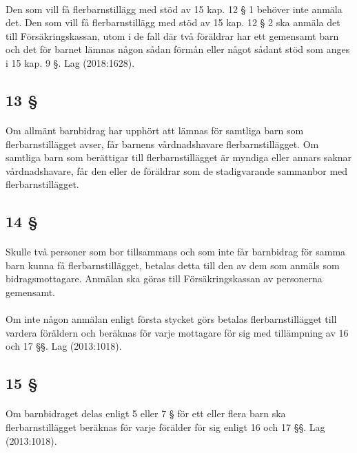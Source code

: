 \documentclass[a4paper,notitlepage,openany,10pt]{book}
\begin{document}
\paragraph*{}
Den som vill få flerbarnstillägg med stöd av 15 kap. 12 § 1 behöver inte anmäla det. Den som vill få flerbarnstillägg med stöd av 15 kap. 12 § 2 ska anmäla det till Försäkringskassan, utom i de fall där två föräldrar har ett gemensamt barn och det för barnet lämnas någon sådan förmån eller något sådant stöd som anges i 15 kap. 9 §.
Lag (2018:1628).
\subsection*{13 §}
\paragraph*{}
Om allmänt barnbidrag har upphört att lämnas för samtliga barn som flerbarnstillägget avser, får barnens vårdnadshavare flerbarnstillägget. Om samtliga barn som berättigar till flerbarnstillägget är myndiga eller annars saknar vårdnadshavare, får den eller de föräldrar som de stadigvarande sammanbor med flerbarnstillägget.
\subsection*{14 §}
\paragraph*{}
Skulle två personer som bor tillsammans och som inte får barnbidrag för samma barn kunna få flerbarnstillägget, betalas detta till den av dem som anmäls som bidragsmottagare. Anmälan ska göras till Försäkringskassan av personerna gemensamt.
\paragraph*{}
Om inte någon anmälan enligt första stycket görs betalas flerbarnstillägget till vardera föräldern och beräknas för varje mottagare för sig med tillämpning av 16 och 17 §§.
Lag (2013:1018).
\subsection*{15 §}
\paragraph*{}
Om barnbidraget delas enligt 5 eller 7 § för ett eller flera barn ska flerbarnstillägget beräknas för varje förälder för sig enligt 16 och 17 §§.
Lag (2013:1018).
\end{document}
